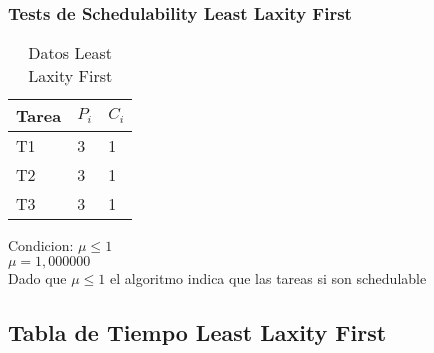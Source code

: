 \documentclass[xcolor=table]{beamer}
\begin{document}
\begin{frame}
\begin{frame} 
\frametitle{Tests de Schedulability  Least Laxity First } 
\begin{table} 
\centering 
\begin{tabular}{|l|l|l|} 
\hline 
\cellcolor{lightgray}Tarea & \cellcolor{lightgray}$P_i$ & \cellcolor{lightgray}$C_i$ \\ \hline 
T1   & 3  &  1\\ \hline 
T2   & 3  &  1\\ \hline 
T3   & 3  &  1\\ \hline 
\end{tabular} 
\caption{Datos  Least Laxity First } 
\end{table} 
Condicion: $\mu \leq 1$ \\ 
$\mu =  1,000000 $ \\ 
Dado que $\mu \leq 1$ el algoritmo indica que las tareas si son schedulable \\ 
\end{frame} 

\subsection{Tabla de Tiempo  Least Laxity First } 


\end{frame}
\end{document}
